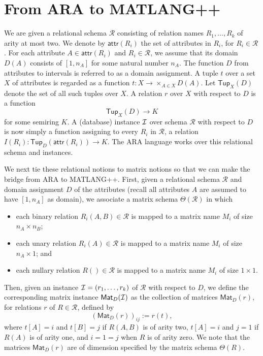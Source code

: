 \newcommand{\cR}{\mathcal{R}}
\newcommand{\Tup}{\mathsf{Tup}}
\newcommand{\attr}[1]{\mathsf{attr}(#1)}
\newcommand{\Matr}{\mathsf{Mat}}
\newtheorem{lemma}{Lemma}
\newtheorem{prop}{Proposition}

\section{From ARA to MATLANG++}
We are given a relational schema $\cR$ consisting of relation names $R_1,\ldots,R_k$ of arity at most two. We denote by $\attr{R_i}$ the set of attributes in $R_i$, for $R_i\in \cR$.
For each attribute $A\in\attr{R_i}$ and $R_i\in\cR$, we assume that its domain $D(A)$ consists of $[1,n_A]$ for some natural number $n_A$. The function $D$ from attributes to intervals is referred to as a domain assignment. A tuple $t$ over a set $X$ of attributes is regarded as a function
$t:X\to \times_{A\in X} D(A)$. Let $\Tup_X(D)$ denote the set of all such tuples over $X$. A relation $r$ over $X$ with respect to $D$ is a function
$$
\Tup_{X}(D)\to K
$$
for some semiring $K$. A (database) instance $\mathcal{I}$ over schema $\cR$ with respect to $D$ is now simply a function assigning to every $R_i$ in $\cR$, a relation $I(R_i):\Tup_{D}(\attr{R_i})\to K$.
The ARA language works over this relational schema and instances.

We next tie these relational notions to matrix notions so that we can make the bridge from ARA to MATLANG++. First, given a relational schema $\cR$ and domain assignment $D$ of the attributes (recall all attributes $A$ are assumed to have $[1,n_A]$ as domain), we associate a matrix schema $\Theta(\cR)$ in which
\begin{itemize}
\item each binary relation $R_i(A,B)\in \cR$ is mapped to a matrix name $M_i$ of size $n_A\times n_B$;
\item each unary relation $R_i(A)\in \cR$ is mapped to a matrix name $M_i$ of size $n_A\times 1$; and
\item each nullary relation $R()\in\cR$ is mapped  to a matrix name $M_i$ of size $1\times 1$. 
\end{itemize}
Then, given an instance $\mathcal{I}=(r_1,\ldots,r_k)$ of $\cR$ with respect to $D$, we define the corresponding matrix instance
$\Matr_D(\cI)$ as the collection of matrices $\Matr_D(r)$, for relations $r$ of $R\in\cR$, defined by
$$
(\Matr_D(r))_{ij}:=r(t),
$$
where $t[A]=i$ and $t[B]=j$ if $R(A,B)$ is of arity two, $t[A]=i$ and $j=1$ if $R(A)$ is of arity one,
and $i=1=j$ when $R$ is of arity zero. We note that the matrices $\Matr_D(r)$ are of dimension specified by the matrix schema $\Theta(R)$.


